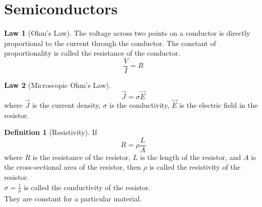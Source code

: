 \documentclass[titlepage, fleqn, a4paper, 12pt, twoside]{article}
\theoremstyle{definition}
\newtheorem{definition}{Definition}
\theoremstyle{theorem}
\newtheorem{law}{Law}
\let\Oldsection\section
\renewcommand{\section}{\FloatBarrier\Oldsection}
\begin{document}
\section{Semiconductors}

\begin{law}[Ohm's Law]
	The voltage across two points on a conductor is directly proportional to the current through the conductor.
	The constant of proportionality is called the resistance of the conductor.
	\begin{equation*}
		\frac{V}{I} = R
	\end{equation*}
	\label{Ohm's_Law}
\end{law}

\begin{law}[Microscopic Ohm's Law]
	\begin{equation*}
		\overrightarrow{J}  = \sigma \overrightarrow{E}
	\end{equation*}
	where $\overrightarrow{J}$ is the current density, $\sigma$ is the conductivity, $\overrightarrow{E}$ is the electric field in the resistor.
	\label{Microscopic_Ohm's_Law}
\end{law}

\begin{definition}[Resistivity]
	If
	\begin{equation*}
		R = \rho \frac{L}{A}
	\end{equation*}
	where $R$ is the resistance of the resistor, $L$ is the length of the resistor, and $A$ is the cross-sectional area of the resistor, then $\rho$ is called the resistivity of the resistor.\\
	$\sigma = \frac{1}{\rho}$ is called the conductivity of the resistor.\\
	They are constant for a particular material.
\end{definition}

\begin{figure}[H]
\end{figure}
\end{document}
